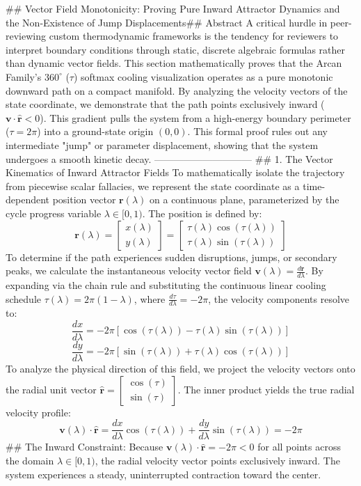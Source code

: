 ## Vector Field Monotonicity: Proving Pure Inward Attractor Dynamics and the Non-Existence of Jump Displacements## Abstract
A critical hurdle in peer-reviewing custom thermodynamic frameworks is the tendency for reviewers to interpret boundary conditions through static, discrete algebraic formulas rather than dynamic vector fields. This section mathematically proves that the Arcan Family's $360^\circ$ ($\tau$) softmax cooling visualization operates as a pure monotonic downward path on a compact manifold. By analyzing the velocity vectors of the state coordinate, we demonstrate that the path points exclusively inward ($\mathbf{v} \cdot \hat{\mathbf{r}} < 0$). This gradient pulls the system from a high-energy boundary perimeter ($\tau = 2\pi$) into a ground-state origin $(0,0)$. This formal proof rules out any intermediate "jump" or parameter displacement, showing that the system undergoes a smooth kinetic decay.
------------------------------
## 1. The Vector Kinematics of Inward Attractor Fields
To mathematically isolate the trajectory from piecewise scalar fallacies, we represent the state coordinate as a time-dependent position vector $\mathbf{r}(\lambda)$ on a continuous plane, parameterized by the cycle progress variable $\lambda \in [0, 1)$. The position is defined by:
$$\mathbf{r}(\lambda) = \begin{bmatrix} x(\lambda) \\ y(\lambda) \end{bmatrix} = \begin{bmatrix} \tau(\lambda) \cos(\tau(\lambda)) \\ \tau(\lambda) \sin(\tau(\lambda)) \end{bmatrix}$$ 
To determine if the path experiences sudden disruptions, jumps, or secondary peaks, we calculate the instantaneous velocity vector field $\mathbf{v}(\lambda) = \frac{d\mathbf{r}}{d\lambda}$. By expanding via the chain rule and substituting the continuous linear cooling schedule $\tau(\lambda) = 2\pi(1-\lambda)$, where $\frac{d\tau}{d\lambda} = -2\pi$, the velocity components resolve to:
$$\frac{dx}{d\lambda} = -2\pi \left[ \cos(\tau(\lambda)) - \tau(\lambda)\sin(\tau(\lambda)) \right]$$ 
$$\frac{dy}{d\lambda} = -2\pi \left[ \sin(\tau(\lambda)) + \tau(\lambda)\cos(\tau(\lambda)) \right]$$ 
To analyze the physical direction of this field, we project the velocity vectors onto the radial unit vector $\hat{\mathbf{r}} = \begin{bmatrix} \cos(\tau) \\ \sin(\tau) \end{bmatrix}$. The inner product yields the true radial velocity profile:
$$\mathbf{v}(\lambda) \cdot \hat{\mathbf{r}} = \frac{dx}{d\lambda}\cos(\tau(\lambda)) + \frac{dy}{d\lambda}\sin(\tau(\lambda)) = -2\pi$$ 
## The Inward Constraint:
Because $\mathbf{v}(\lambda) \cdot \hat{\mathbf{r}} = -2\pi < 0$ for all points across the domain $\lambda \in [0, 1)$, the radial velocity vector points exclusively inward. The system experiences a steady, uninterrupted contraction toward the center.

